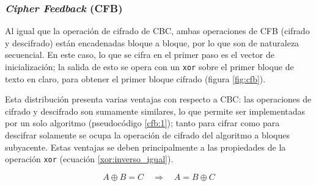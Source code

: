 %
%

\subsubsection{\textit{Cipher Feedback} (CFB)}

Al igual que la operación de cifrado de CBC, ambas operaciones de CFB (cifrado
y descifrado) están encadenadas bloque a bloque, por lo que son de naturaleza
secuencial. En este caso, lo que se cifra en el primer paso es el vector de
inicialización; la salida de esto se opera con un \verb|xor| sobre el primer
bloque de texto en claro, para obtener el primer bloque cifrado (figura
\ref{fig:cfb}).

Esta distribución presenta varias ventajas con respecto a CBC: las operaciones
de cifrado y descifrado son sumamente similares, lo que permite ser
implementadas por un solo algoritmo (pseudocódigo \ref{cfb:1}); tanto para
cifrar como para descifrar solamente se ocupa la operación de cifrado del
algoritmo a bloques subyacente. Estas ventajas se deben principalmente a las
propiedades de la operación \verb|xor| (ecuación \ref{xor:inverso_igual}).

\begin{equation}
  \label{xor:inverso_igual}
  A \oplus B = C \quad \Rightarrow \quad A = B \oplus C
\end{equation}


